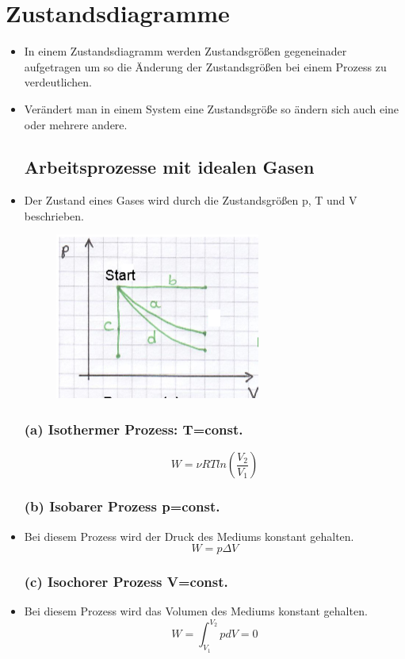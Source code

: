 \documentclass[10pt,a4paper]{article}
\begin{document}
\section{Zustandsdiagramme}
\begin{itemize}
\item In einem Zustandsdiagramm werden Zustandsgrößen gegeneinader aufgetragen um so die Änderung der Zustandsgrößen bei einem Prozess zu verdeutlichen.
\item Verändert man in einem System eine Zustandsgröße so ändern sich auch eine oder mehrere andere.
\subsection{Arbeitsprozesse mit idealen Gasen}
\item Der Zustand eines Gases wird durch die Zustandsgrößen p, T und V beschrieben. \newline 
\begin{figure}[hbtp]
\centering
\includegraphics[scale=0.7]{zustandsdiagramm.PNG}
\end{figure}

\subsubsection{(a) Isothermer Prozess: T=const.}
\begin{equation}
W= \nu R T ln(\frac{V_2}{V_1})
\end{equation}
\subsubsection{(b) Isobarer Prozess p=const.}
\item Bei diesem Prozess wird der Druck des Mediums konstant gehalten.
\begin{equation}
W=p \Delta V
\end{equation}
\subsubsection{(c) Isochorer Prozess V=const.}
\item Bei diesem Prozess wird das Volumen des Mediums konstant gehalten.
\begin{equation}
W= \int^{V_2}_{V_1} p dV=0
\end{equation}

\end{itemize}
\end{document}
